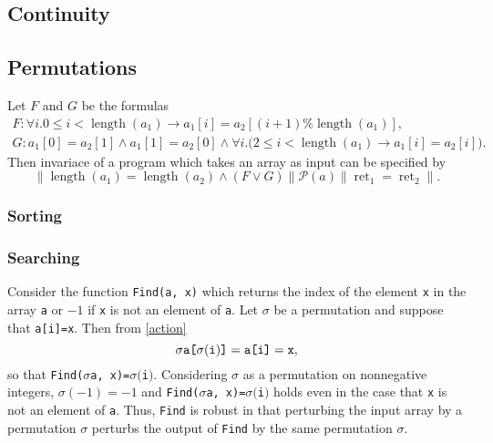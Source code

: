 \documentclass{llncs}
\DeclareMathOperator{\Perm}{Perm}
\DeclareMathOperator{\len}{length}
\DeclareMathOperator{\ret}{ret}
\begin{document}
\subsection{Continuity}


\subsection{Permutations}


Let \(F\) and \(G\) be the formulas
\begin{gather*}
    F:  \forall i. 0 \leq i < \len(a_{1}) \rightarrow a_{1}[i] = a_{2}[(i+1)\%\len(a_{1})],\\
        G: a_{1}[0] = a_{2}[1] \wedge a_{1}[1] = a_{2}[0] \wedge \forall i.\big( 2 \leq i < \len(a_{1}) \rightarrow a_{1}[i] = a_{2}[i] \big).
\end{gather*}
Then invariace of a program which takes an array as input can be specified by
\[\|\len(a_{1}) = \len(a_{2}) \wedge (F \vee G)\| \mathcal{P}(a) \|\ret_{1} = \ret_{2}\|.\]

\subsubsection{Sorting}


\subsubsection{Searching}

Consider the function \verb!Find(a, x)! which returns the index of the element \verb!x! in the array \verb!a! or \(-1\) if \verb!x! is not an element of \verb!a!.  Let \(\sigma\) be a permutation and suppose that \verb!a[i]=x!.  Then from \eqref{action}
\[\sigma\verb!a[!\sigma(\verb!i!)\verb!]! = \verb!a[i]! = \verb!x!,\]
so that \verb!Find(!\(\sigma\)\verb!a, x)=!\(\sigma(\)\verb!i!\()\).  Considering \(\sigma\) as a permutation on nonnegative integers, \(\sigma(-1) = -1\) and \verb!Find(!\(\sigma\)\verb!a, x)=!\(\sigma(\)\verb!i!\()\) holds even in the case that \verb!x! is not an element of \verb!a!.  Thus, \verb!Find! is robust in that perturbing the input array by a permutation \(\sigma\) perturbs the output of \verb!Find! by the same permutation \(\sigma\).
\end{document}
